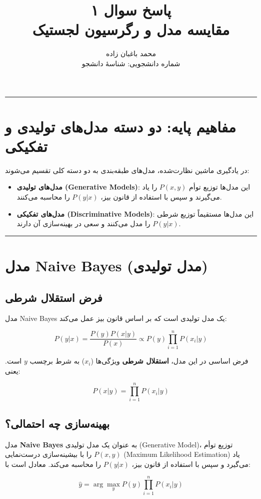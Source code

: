 \documentclass[11pt,a4paper]{article}
\title{\textbf{پاسخ سوال ۱} \\[0.4cm] \small مقایسه مدل \en{Naive Bayes} و رگرسیون لجستیک}
\author{محمد باغبان زاده \\ شماره دانشجویی: شناسهٔ دانشجو}
\date{}
\newcommand{\en}[1]{\textenglish{#1}}
\newcommand{\separator}{\vspace{1em}\noindent\rule{\linewidth}{0.4pt}\vspace{1em}}
\newcommand{\thickseparator}{\vspace{1em}\noindent\rule{\linewidth}{1pt}\vspace{1em}}
\begin{document}
\maketitle
\thickseparator

\section{مفاهیم پایه: دو دسته مدل‌های تولیدی و تفکیکی}

در یادگیری ماشین نظارت‌شده، مدل‌های طبقه‌بندی به دو دسته کلی تقسیم می‌شوند:

\begin{itemize}
    \item \textbf{مدل‌های تولیدی (\en{Generative Models})}: این مدل‌ها توزیع توأم \(P(x,y)\) را یاد می‌گیرند و سپس با استفاده از قانون بیز، \(P(y|x)\) را محاسبه می‌کنند.
    \item \textbf{مدل‌های تفکیکی (\en{Discriminative Models})}: این مدل‌ها مستقیماً توزیع شرطی \(P(y|x)\) را مدل می‌کنند و سعی در بهینه‌سازی آن دارند.
\end{itemize}

\separator
\section{مدل \en{Naive Bayes} (مدل تولیدی)}

\subsection{فرض استقلال شرطی}
مدل \en{Naive Bayes} یک مدل تولیدی است که بر اساس قانون بیز عمل می‌کند:

\[
P(y|x) = \frac{P(y) P(x|y)}{P(x)} \propto P(y) \prod_{i=1}^{n} P(x_i|y)
\]

فرض اساسی در این مدل، \textbf{استقلال شرطی} ویژگی‌ها (\(x_i\)) به شرط برچسب \(y\) است. یعنی:

\[
P(x|y) = \prod_{i=1}^{n} P(x_i|y)
\]

\newpage
\subsection{بهینه‌سازی چه احتمالی؟}
مدل \textbf{\en{Naive Bayes}} به عنوان یک مدل تولیدی (\en{Generative Model})، توزیع توأم \(P(x,y)\) را با بیشینه‌سازی درست‌نمایی (\en{Maximum Likelihood Estimation}) یاد می‌گیرد و سپس با استفاده از قانون بیز، \(P(y|x)\) را محاسبه می‌کند. معادل است با:

\[
\hat{y} = \arg\max_{y} P(y) \prod_{i=1}^{n} P(x_i|y)
\]
\end{document}
